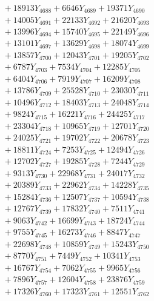 \documentclass[a4paper,10pt]{article}
\begin{document}
{\begin{align}
&\;  + 18913 Y_{4688} + 6646 Y_{4689} + 19371 Y_{4690} \\[0.3ex]
&\;  + 14005 Y_{4691} + 22133 Y_{4692} + 21620 Y_{4693} \\[0.3ex]
&\;  + 13996 Y_{4694} + 15740 Y_{4695} + 22149 Y_{4696} \\[0.3ex]
&\;  + 13101 Y_{4697} + 13629 Y_{4698} + 18074 Y_{4699} \\[0.3ex]
&\;  + 13857 Y_{4700} + 12043 Y_{4701} + 19205 Y_{4702} \\[0.3ex]
&\;  + 6787 Y_{4703} + 7534 Y_{4704} + 12285 Y_{4705} \\[0.3ex]
&\;  + 6404 Y_{4706} + 7919 Y_{4707} + 16209 Y_{4708} \\[0.5ex]\allowbreak
&\;  + 13786 Y_{4709} + 25528 Y_{4710} + 23030 Y_{4711} \\[0.3ex]
&\;  + 10496 Y_{4712} + 18403 Y_{4713} + 24048 Y_{4714} \\[0.3ex]
&\;  + 9824 Y_{4715} + 16221 Y_{4716} + 24425 Y_{4717} \\[0.3ex]
&\;  + 23304 Y_{4718} + 10965 Y_{4719} + 12701 Y_{4720} \\[0.3ex]
&\;  + 24025 Y_{4721} + 19702 Y_{4722} + 20678 Y_{4723} \\[0.3ex]
&\;  + 18811 Y_{4724} + 7253 Y_{4725} + 12494 Y_{4726} \\[0.3ex]
&\;  + 12702 Y_{4727} + 19285 Y_{4728} + 7244 Y_{4729} \\[0.3ex]
&\;  + 9313 Y_{4730} + 22968 Y_{4731} + 24017 Y_{4732} \\[0.3ex]
&\;  + 20389 Y_{4733} + 22962 Y_{4734} + 14228 Y_{4735} \\[0.3ex]
&\;  + 15284 Y_{4736} + 12507 Y_{4737} + 10594 Y_{4738} \\[0.5ex]\allowbreak
&\;  + 12767 Y_{4739} + 17832 Y_{4740} + 7511 Y_{4741} \\[0.3ex]
&\;  + 9063 Y_{4742} + 16699 Y_{4743} + 18724 Y_{4744} \\[0.3ex]
&\;  + 9755 Y_{4745} + 16273 Y_{4746} + 8847 Y_{4747} \\[0.3ex]
&\;  + 22698 Y_{4748} + 10859 Y_{4749} + 15243 Y_{4750} \\[0.3ex]
&\;  + 8770 Y_{4751} + 7449 Y_{4752} + 10341 Y_{4753} \\[0.3ex]
&\;  + 16767 Y_{4754} + 7062 Y_{4755} + 9965 Y_{4756} \\[0.3ex]
&\;  + 7896 Y_{4757} + 12604 Y_{4758} + 23876 Y_{4759} \\[0.3ex]
&\;  + 17326 Y_{4760} + 17323 Y_{4761} + 12551 Y_{4762} \\[0.3ex]

\end{align}}
\end{document}
